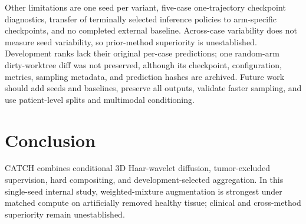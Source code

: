 Other limitations are one seed per variant, five-case one-trajectory checkpoint
diagnostics, transfer of terminally selected inference policies to arm-specific
checkpoints, and no completed external baseline. Across-case variability does not
measure seed variability, so prior-method superiority is unestablished. Development
ranks lack their original per-case predictions; one random-arm dirty-worktree diff
was not preserved, although its checkpoint, configuration, metrics, sampling
metadata, and prediction hashes are archived. Future work should add seeds and
baselines, preserve all outputs, validate faster sampling, and use patient-level
splits and multimodal conditioning.

\section{Conclusion}
\label{sec:conclusion}

CATCH combines conditional 3D Haar-wavelet diffusion, tumor-excluded supervision,
hard compositing, and development-selected aggregation. In this single-seed
internal study, weighted-mixture augmentation is strongest under matched compute on
artificially removed healthy tissue; clinical and cross-method superiority remain
unestablished.
